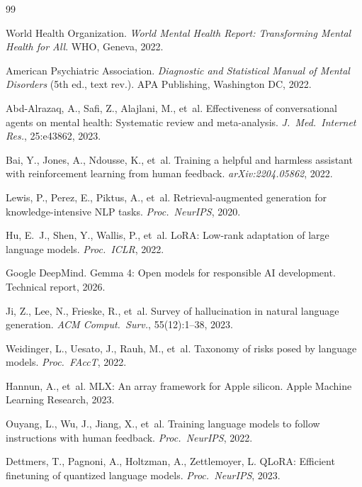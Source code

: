 \documentclass[11pt, a4paper, twocolumn]{article}
\begin{document}
\begin{thebibliography}{99}
\footnotesize

World Health Organization.
\textit{World Mental Health Report: Transforming Mental Health for All}.
WHO, Geneva, 2022.

American Psychiatric Association.
\textit{Diagnostic and Statistical Manual of Mental Disorders} (5th ed., text rev.).
APA Publishing, Washington DC, 2022.

Abd-Alrazaq, A., Safi, Z., Alajlani, M., et~al.
Effectiveness of conversational agents on mental health: Systematic review and meta-analysis.
\textit{J.~Med.~Internet Res.}, 25:e43862, 2023.

Bai, Y., Jones, A., Ndousse, K., et~al.
Training a helpful and harmless assistant with reinforcement learning from human feedback.
\textit{arXiv:2204.05862}, 2022.

Lewis, P., Perez, E., Piktus, A., et~al.
Retrieval-augmented generation for knowledge-intensive NLP tasks.
\textit{Proc.~NeurIPS}, 2020.

Hu, E.~J., Shen, Y., Wallis, P., et~al.
LoRA: Low-rank adaptation of large language models.
\textit{Proc.~ICLR}, 2022.

Google DeepMind.
Gemma 4: Open models for responsible AI development.
Technical report, 2026.

Ji, Z., Lee, N., Frieske, R., et~al.
Survey of hallucination in natural language generation.
\textit{ACM Comput.~Surv.}, 55(12):1--38, 2023.

Weidinger, L., Uesato, J., Rauh, M., et~al.
Taxonomy of risks posed by language models.
\textit{Proc.~FAccT}, 2022.

Hannun, A., et~al.
MLX: An array framework for Apple silicon.
Apple Machine Learning Research, 2023.

Ouyang, L., Wu, J., Jiang, X., et~al.
Training language models to follow instructions with human feedback.
\textit{Proc.~NeurIPS}, 2022.

Dettmers, T., Pagnoni, A., Holtzman, A., Zettlemoyer, L.
QLoRA: Efficient finetuning of quantized language models.
\textit{Proc.~NeurIPS}, 2023.

\end{thebibliography}
\end{document}
